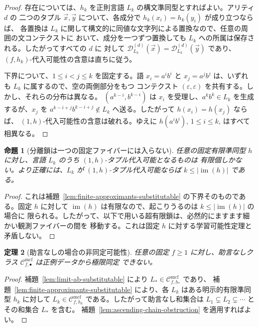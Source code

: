 \documentclass[11pt,a4paper]{ltjsarticle}
\newtheorem{theorem}{定理}[section]
\newtheorem{proposition}[theorem]{命題}
\theoremstyle{remark}
\newcommand{\Cmcf}[2]{\mathcal{C}^{\mathrm{mcf}}_{#1,#2}}
\newcommand{\D}{\mathcal{D}}
\newcommand{\tuple}[1]{\vec{#1}}
\newcommand{\eps}{\varepsilon}
\begin{document}
\begin{proof}
存在については、\(h_k\) を正則言語 \(L_k\) の構文準同型とすればよい。アリティ \(d\) の
二つのタプル \(\tuple x,\tuple y\) について、各成分で \(h_k(x_i)=h_k(y_i)\) が成り立つならば、
各置換は \(L_k\) に関して構文的に同値な文字列による置換なので、任意の周囲の文コンテクストに
おいて、成分を一つずつ置換しても \(L_k\) への所属は保存される。したがってすべての \(d\) に
対して \(\D_{L_k}^{(d)}(\tuple x)=\D_{L_k}^{(d)}(\tuple y)\) であり、
\((f,h_k)\)-代入可能性の含意は直ちに従う。

下界について、\(1\le i<j\le k\) を固定する。語
\(x_i=a^i b^i\) と \(x_j=a^j b^j\) は、いずれも \(L_k\) に属するので、空の両側部分をもつ
コンテクスト \((\eps,\eps)\) を共有する。しかし、それらの分布は異なる。
\((a^{k-i},b^{k-i})\) は \(x_i\) を受理し、\(a^k b^k\in L_k\) を生成するが、\(x_j\) を
\(a^{k-i+j}b^{k-i+j}\notin L_k\) へ送る。したがって \(h(x_i)=h(x_j)\) ならば、
\((1,h)\)-代入可能性の含意は破れる。ゆえに
\(h(a^i b^i)\), \(1\le i\le k\), はすべて相異なる。
\end{proof}

\begin{proposition}[分離鎖は一つの固定ファイバーには入らない]
\label{prop:separating-chain-not-one-fiber}
任意の固定有限準同型 \(h\) に対し、言語 \(L_k\) のうち \((1,h)\)-タプル代入可能となるものは
有限個しかない。より正確には、\(L_k\) が \((1,h)\)-タプル代入可能ならば
\(k\le|\operatorname{im}(h)|\) である。
\end{proposition}

\begin{proof}
これは補題~\ref{lem:finite-approximants-substitutable} の下界そのものである。固定 \(h\) に対して
\(\operatorname{im}(h)\) は有限なので、起こりうるのは \(k\le|\operatorname{im}(h)|\) の場合に
限られる。したがって、以下で用いる超有限鎖は、必然的にますます細かい観測ファイバーの間を
移動する。これは固定 \(h\) に対する学習可能性定理と矛盾しない。
\end{proof}

\begin{theorem}[助言なしの場合の非同定可能性]
\label{thm:no-advice-nonidentifiability}
任意の固定 \(f\ge1\) に対し、助言なしクラス \(\Cmcf{f}{\bullet}\) は正例データから極限同定
できない。
\end{theorem}

\begin{proof}
補題~\ref{lem:limit-ab-substitutable} により \(L_*\in\Cmcf{f}{h_*}\) であり、
補題~\ref{lem:finite-approximants-substitutable} により、各 \(L_k\) はある明示的有限準同型
\(h_k\) に対して \(L_k\in\Cmcf{f}{h_k}\) である。したがって助言なし和集合は
\(L_1\subsetneq L_2\subsetneq\cdots\) とその和集合 \(L_*\) を含む。
補題~\ref{lem:ascending-chain-obstruction} を適用すればよい。
\end{proof}
\end{document}
